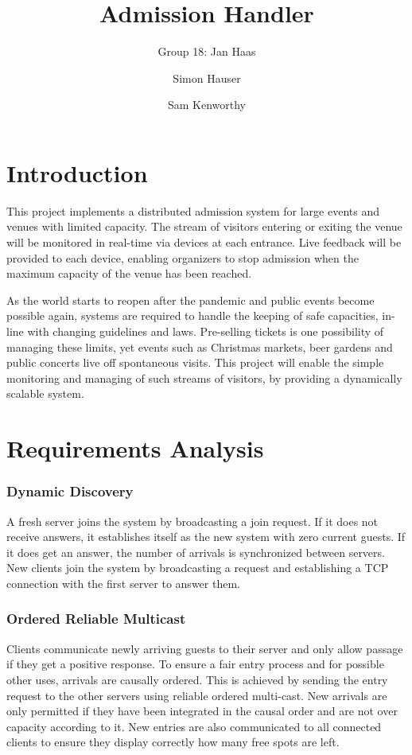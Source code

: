 \documentclass[runningheads]{llncs}
\begin{document}
%
\title{Admission Handler}

\author{Group 18: Jan Haas \and Simon Hauser \and Sam Kenworthy}

\institute{}
%
\maketitle              %

\section{Introduction}
This project implements a distributed admission system for large events and venues with limited capacity.
The stream of visitors entering or exiting the venue will be monitored in real-time via devices at each entrance.
Live feedback will be provided to each device, enabling organizers to stop admission when the maximum capacity of the venue has been reached.

As the world starts to reopen after the pandemic and public events become possible again, systems are required to handle the keeping of safe capacities, in-line with changing guidelines and laws.
Pre-selling tickets is one possibility of managing these limits, yet events such as Christmas markets, beer gardens and public concerts live off spontaneous visits.
This project will enable the simple monitoring and managing of such streams of visitors, by providing a dynamically scalable system.

\section{Requirements Analysis}
\subsubsection{Dynamic Discovery}
A fresh server joins the system by broadcasting a join request.
If it does not receive answers, it establishes itself as the new system with zero current guests.
If it does get an answer, the number of arrivals is synchronized between servers.
New clients join the system by broadcasting a request and establishing a TCP connection with the first server to answer them.

\subsubsection{Ordered Reliable Multicast}
Clients communicate newly arriving guests to their server and only allow passage if they get a positive response.
To ensure a fair entry process and for possible other uses, arrivals are causally ordered.
This is achieved by sending the entry request to the other servers using reliable ordered multi-cast.
New arrivals are only permitted if they have been integrated in the causal order and are not over capacity according to it.
New entries are also communicated to all connected clients to ensure they display correctly how many free spots are left.
\end{document}
